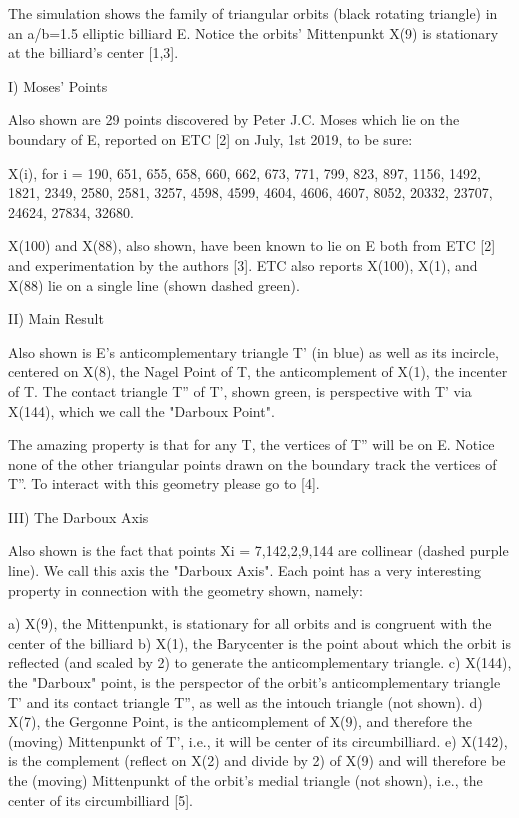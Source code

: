 The simulation shows the family of triangular orbits (black rotating triangle) in an a/b=1.5 elliptic billiard E. Notice the orbits' Mittenpunkt X(9) is stationary at the billiard's center [1,3].

I) Moses' Points

Also shown are 29 points discovered by Peter J.C. Moses which lie on the boundary of E, reported on ETC [2] on July, 1st 2019, to be sure:

X(i), for i = 190, 651, 655, 658, 660, 662, 673, 771, 799, 823, 897, 1156, 1492, 1821, 2349, 2580, 2581, 3257, 4598, 4599, 4604, 4606, 4607, 8052, 20332, 23707, 24624, 27834, 32680.

X(100) and X(88), also shown, have been known to lie on E both from ETC [2] and experimentation by the authors [3]. ETC also reports X(100), X(1), and X(88) lie on a single line (shown dashed green).

II) Main Result

Also shown is E's anticomplementary triangle T' (in blue) as well as its incircle, centered on X(8), the Nagel Point of T, the anticomplement of X(1), the incenter of T. The contact triangle T'' of T', shown green, is perspective with T' via X(144), which we call the "Darboux Point".

The amazing property is that for any T, the vertices of T'' will be on E. Notice none of the other triangular points drawn on the boundary track the vertices of T''. To interact with this geometry please go to [4].

III) The Darboux Axis

Also shown is the fact that points Xi = 7,142,2,9,144 are collinear (dashed purple line). We call this axis the "Darboux Axis". Each point has a very interesting property in connection with the geometry shown, namely:

a) X(9), the Mittenpunkt, is stationary for all orbits and is congruent with the center of the billiard
b) X(1), the Barycenter is the point about which the orbit is reflected (and scaled by 2) to generate the anticomplementary triangle.
c) X(144), the "Darboux" point, is the perspector of the orbit's anticomplementary triangle T' and its contact triangle T'', as well as the intouch triangle (not shown).
d) X(7), the Gergonne Point, is the anticomplement of X(9), and therefore the (moving) Mittenpunkt of T', i.e., it will be center of its circumbilliard.
e) X(142), is the complement (reflect on X(2) and divide by 2) of X(9) and will therefore be the (moving) Mittenpunkt of the orbit's medial triangle (not shown), i.e., the center of its circumbilliard [5].


